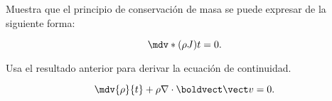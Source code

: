 \documentclass[../main.tex]{subfiles}
\begin{document}
\begin{problema}
	Muestra que el principio de conservación de masa se puede expresar
	de la siguiente forma:

	\begin{equation*}
		\mdv*{(\rho J)}{t} = 0.
	\end{equation*}

	Usa el resultado anterior para derivar la ecuación de continuidad.

	\begin{equation*}
		\mdv{\rho}{t} + \rho \dotp{\nabla}{\vb{v}} = 0.
	\end{equation*}
\end{problema}
\end{document}
